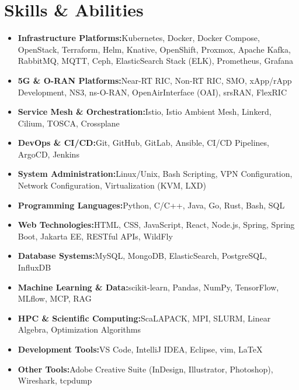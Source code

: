 \documentclass[a4paper,11pt]{article}
\newcommand{\resumeItem}[2]{
  \item[]{
    \textbf{#1}{\hspace{0.5mm}#2 \vspace{-0.5mm}}
  }
}
\newcommand{\resumeSubItem}[2]{\resumeItem{#1}{#2}\vspace{-4pt}}
\newcommand{\resumeHeadingSkillStart}{\begin{itemize}[leftmargin=*,itemsep=1.7mm, rightmargin=2ex]}
\newcommand{\resumeHeadingSkillEnd}{\end{itemize}\vspace{-2mm}}
\begin{document}
\section{\textbf{Skills \& Abilities}}
\vspace{-0.4mm}
 \resumeHeadingSkillStart
  \resumeSubItem{Infrastructure Platforms:}
    {Kubernetes, Docker, Docker Compose, OpenStack, Terraform, Helm, Knative, OpenShift, Proxmox, Apache Kafka, RabbitMQ, MQTT, Ceph, ElasticSearch Stack (ELK), Prometheus, Grafana}
  \resumeSubItem{5G \& O-RAN Platforms:}
    {Near-RT RIC, Non-RT RIC, SMO, xApp/rApp Development, NS3, ns-O-RAN, OpenAirInterface (OAI), srsRAN, FlexRIC}
  \resumeSubItem{Service Mesh \& Orchestration:}
    {Istio, Istio Ambient Mesh, Linkerd, Cilium, TOSCA, Crossplane}
  \resumeSubItem{DevOps \& CI/CD:}
    {Git, GitHub, GitLab, Ansible, CI/CD Pipelines, ArgoCD, Jenkins}
  \resumeSubItem{System Administration:}
    {Linux/Unix, Bash Scripting, VPN Configuration, Network Configuration, Virtualization (KVM, LXD)}
  \resumeSubItem{Programming Languages:}
    {Python, C/C++, Java, Go, Rust, Bash, SQL}
  \resumeSubItem{Web Technologies:}
    {HTML, CSS, JavaScript, React, Node.js, Spring, Spring Boot, Jakarta EE, RESTful APIs, WildFly}
  \resumeSubItem{Database Systems:}
    {MySQL, MongoDB, ElasticSearch, PostgreSQL, InfluxDB}
  \resumeSubItem{Machine Learning \& Data:}
    {scikit-learn, Pandas, NumPy, TensorFlow, MLflow, MCP, RAG}
  \resumeSubItem{HPC \& Scientific Computing:}
    {ScaLAPACK, MPI, SLURM, Linear Algebra, Optimization Algorithms}
  \resumeSubItem{Development Tools:}
    {VS Code, IntelliJ IDEA, Eclipse, vim, LaTeX}
  \resumeSubItem{Other Tools:}
    {Adobe Creative Suite (InDesign, Illustrator, Photoshop), Wireshark, tcpdump}
 \resumeHeadingSkillEnd
\end{document}
